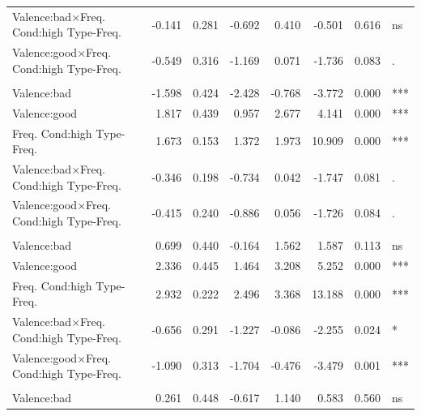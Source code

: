 \documentclass[
]{article}
\begin{document}
\begin{longtable}[t]{lrrrrrrl}
Valence:bad$\times$Freq.
Cond:high
\hspace{1em}Type-Freq. & -0.141 & 0.281 & -0.692 & 0.410 & -0.501 & 0.616 & ns\\
Valence:good$\times$Freq.
Cond:high
\hspace{1em}Type-Freq. & -0.549 & 0.316 & -1.169 & 0.071 & -1.736 & 0.083 & .\\
\addlinespace[0.3em]
\multicolumn{8}{l}{\textbf{Third Party Acceptability - Testable}}\\
\hspace{1em}Valence:bad & -1.598 & 0.424 & -2.428 & -0.768 & -3.772 & 0.000 & ***\\
\hspace{1em}Valence:good & 1.817 & 0.439 & 0.957 & 2.677 & 4.141 & 0.000 & ***\\
Freq.
Cond:high
\hspace{1em}Type-Freq. & 1.673 & 0.153 & 1.372 & 1.973 & 10.909 & 0.000 & ***\\
Valence:bad$\times$Freq.
Cond:high
\hspace{1em}Type-Freq. & -0.346 & 0.198 & -0.734 & 0.042 & -1.747 & 0.081 & .\\
Valence:good$\times$Freq.
Cond:high
\hspace{1em}Type-Freq. & -0.415 & 0.240 & -0.886 & 0.056 & -1.726 & 0.084 & .\\
\addlinespace[0.3em]
\multicolumn{8}{l}{\textbf{Prevalence - Students}}\\
\hspace{1em}Valence:bad & 0.699 & 0.440 & -0.164 & 1.562 & 1.587 & 0.113 & ns\\
\hspace{1em}Valence:good & 2.336 & 0.445 & 1.464 & 3.208 & 5.252 & 0.000 & ***\\
Freq.
Cond:high
\hspace{1em}Type-Freq. & 2.932 & 0.222 & 2.496 & 3.368 & 13.188 & 0.000 & ***\\
Valence:bad$\times$Freq.
Cond:high
\hspace{1em}Type-Freq. & -0.656 & 0.291 & -1.227 & -0.086 & -2.255 & 0.024 & *\\
Valence:good$\times$Freq.
Cond:high
\hspace{1em}Type-Freq. & -1.090 & 0.313 & -1.704 & -0.476 & -3.479 & 0.001 & ***\\
\addlinespace[0.3em]
\multicolumn{8}{l}{\textbf{Prevalence - Testable}}\\
\hspace{1em}Valence:bad & 0.261 & 0.448 & -0.617 & 1.140 & 0.583 & 0.560 & ns\\

\end{longtable}
\end{document}
